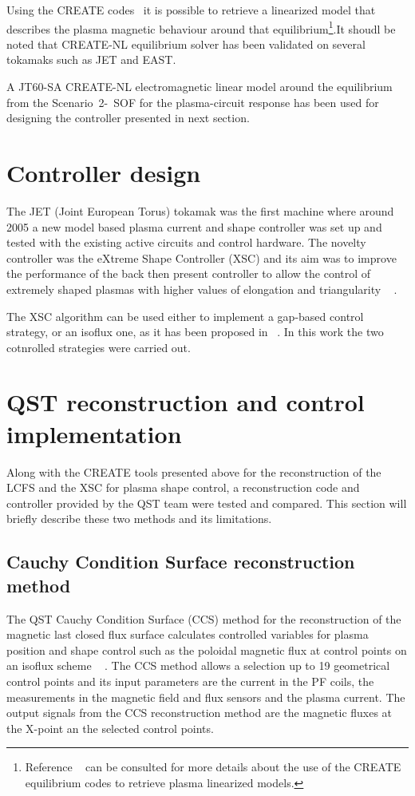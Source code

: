 Using the CREATE codes~\cite{Albanese:CREATEL,Albanese:CREATENLnew} it is possible to retrieve a linearized model that describes the plasma magnetic behaviour around that equilibrium\footnote{Reference  ~\cite[Sec.~3]{NCruz} can be consulted for more details about the use of the CREATE equilibrium codes to retrieve plasma linearized models.}.It shoudl be noted that CREATE-NL equilibrium solver has been validated on several tokamaks such as JET and EAST.
\smallskip

A JT60-SA CREATE-NL electromagnetic linear model around the equilibrium from the Scenario~2-~SOF  for the plasma-circuit response has been used for  designing  the controller presented in next section.




\section{Controller design}

The JET (Joint European Torus) tokamak was the first machine where around 2005 a new model based plasma current and shape controller was set up and tested  with the existing active circuits and control hardware. The novelty controller was the eXtreme Shape Controller (XSC) and its aim was to improve  the performance of the back then present controller to allow the control of extremely shaped plasmas with higher values of elongation and triangularity ~\cite{Albanese2005} . 
 \smallskip
 
 The XSC algorithm can be used either to implement a gap-based control strategy, or an isoflux one, as it has been proposed in ~\cite{NCruz}. In this work the two cotnrolled strategies were carried out.







\section{QST reconstruction and control implementation}

Along with the CREATE tools presented above  for the reconstruction of the LCFS and the XSC for plasma shape control, a reconstruction code and controller provided by the QST team were tested and compared. This section will briefly describe these two methods and its limitations.  

\subsection{Cauchy Condition Surface reconstruction  method }
The QST Cauchy Condition Surface (CCS) method for the reconstruction of the magnetic last closed flux surface calculates controlled variables for plasma position and shape control such as the poloidal magnetic flux at control points on an isoflux scheme  ~\cite{CCS} . The CCS method allows a selection up to 19 geometrical control points and its input parameters are the current in the PF coils, the measurements in the magnetic field and flux sensors and the plasma current. The output signals from the CCS reconstruction method are the magnetic fluxes at the X-point an the selected control points. 

